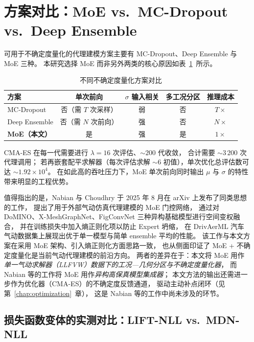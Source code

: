 \section{方案对比：MoE vs.\ MC-Dropout vs.\ Deep Ensemble}

可用于不确定度量化的代理建模方案主要有 MC-Dropout、Deep Ensemble 与 MoE 三种。
本研究选择 MoE 而非另外两类的核心原因如表~\ref{tab:uncertainty_compare}~所示。

\begin{table}[htbp]
\centering
\caption{不同不确定度量化方案对比}
\label{tab:uncertainty_compare}
\begin{tabular}{lcccc}
\toprule
\textbf{方案} & \textbf{单次前向} & \textbf{$\sigma$ 输入相关} & \textbf{多工况分区} & \textbf{推理成本} \\
\midrule
MC-Dropout & 否（需 $T$ 次采样） & 弱 & 否 & $T \times$ \\
Deep Ensemble & 否（需 $N$ 次前向） & 强 & 否 & $N \times$ \\
\textbf{MoE（本文）} & 是 & 强 & 是 & $1 \times$ \\
\bottomrule
\end{tabular}
\end{table}

CMA-ES 在每一代需要进行 $\lambda = 16$ 次评估、$\sim 200$ 代收敛，
合计需要 $\sim 3\,200$ 次代理调用；
若再嵌套配平求解器（每次评估求解 $\sim 6$ 初值），单次优化总评估数可达 $\sim 1.92 \times 10^4$。
在如此高的吞吐压力下，MoE 单次前向同时输出 $\mu$ 与 $\sigma$ 的特性带来明显的工程优势。

值得指出的是，Nabian 与 Choudhry\cite{Nabian2025moe} 于 2025 年 8 月在 arXiv 上发布了同类思想的工作，
提出了用于外部气动仿真代理建模的 MoE 门控网络，
通过对 DoMINO、X-MeshGraphNet、FigConvNet 三种异构基础模型进行空间变权融合，
并在训练损失中加入熵正则化项以防止 Expert 坍缩，
在 DrivAerML 汽车气动数据集上展现出优于单一模型与简单 ensemble 平均的性能。
该工作与本文方案在采用 MoE 架构、引入熵正则化方面思路一致，
也从侧面印证了 MoE + 不确定度量化是当前气动代理建模的前沿方向。
两者的差异在于：本文将 MoE 用作\emph{单一气动求解器（LLFVW）数据下的工况—几何分区与不确定度量化器}，
而 Nabian 等的工作将 MoE 用作\emph{异构高保真模型集成器}；
本文方法的输出还需进一步作为优化器（CMA-ES）的不确定度反馈通道，
驱动主动补点闭环（见第~\ref{chap:optimization}~章），
这是 Nabian 等的工作中尚未涉及的环节。

\subsection{损失函数变体的实测对比：LIFT-NLL vs.\ MDN-NLL}
\label{sec:lift_vs_mdn}

